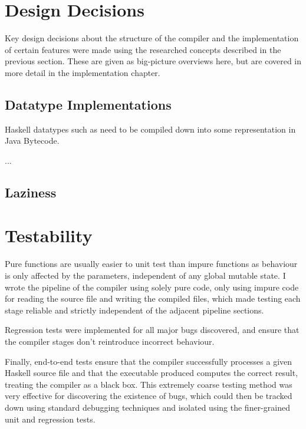 \documentclass[dissertation.tex]{subfiles}
\begin{document}
\section{Design Decisions}
{

    Key design decisions about the structure of the compiler and the implementation of certain features were made using
    the researched concepts described in the previous section. These are given as big-picture overviews here, but are
    covered in more detail in the implementation chapter.

    \subsection{Datatype Implementations}
    {

        Haskell datatypes such as  need to be compiled down into some
        representation in Java Bytecode.

        ...


    }
    \subsection{Laziness}
    {


    }

}
\section{Testability}
{

    Pure functions are usually easier to unit test than impure functions as behaviour is only affected by the
    parameters, independent of any global mutable state. I wrote the pipeline of the compiler using solely pure code,
    only using impure code for reading the source file and writing the compiled files, which made testing each stage
    reliable and strictly independent of the adjacent pipeline sections.

    Regression tests were implemented for all major bugs discovered, and ensure that the compiler stages don't
    reintroduce incorrect behaviour.

    Finally, end-to-end tests ensure that the compiler successfully processes a given Haskell source file and that the
    executable produced computes the correct result, treating the compiler as a black box. This extremely coarse testing
    method was very effective for discovering the existence of bugs, which could then be tracked down using standard
    debugging techniques and isolated using the finer-grained unit and regression tests.


}
\end{document}
